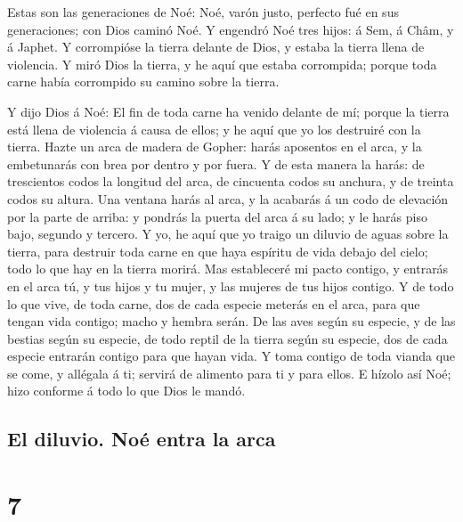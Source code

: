  Estas son las generaciones de Noé: Noé, varón justo,
perfecto fué en sus generaciones; con Dios caminó Noé.  Y
engendró Noé tres hijos: á Sem, á Châm, y á Japhet.  Y
corrompióse la tierra delante de Dios, y estaba la tierra llena de
violencia.  Y miró Dios la tierra, y he aquí que estaba
corrompida; porque toda carne había corrompido su camino sobre la
tierra.

 Y dijo Dios á Noé: El fin de toda carne ha venido
delante de mí; porque la tierra está llena de violencia á causa de
ellos; y he aquí que yo los destruiré con la tierra. 
Hazte un arca de madera de Gopher: harás aposentos en el arca, y la
embetunarás con brea por dentro y por fuera.  Y de esta
manera la harás: de trescientos codos la longitud del arca, de cincuenta
codos su anchura, y de treinta codos su altura.  Una
ventana harás al arca, y la acabarás á un codo de elevación por la parte
de arriba: y pondrás la puerta del arca á su lado; y le harás piso bajo,
segundo y tercero.  Y yo, he aquí que yo traigo un
diluvio de aguas sobre la tierra, para destruir toda carne en que haya
espíritu de vida debajo del cielo; todo lo que hay en la tierra morirá.
 Mas estableceré mi pacto contigo, y entrarás en el arca
tú, y tus hijos y tu mujer, y las mujeres de tus hijos contigo.
 Y de todo lo que vive, de toda carne, dos de cada
especie meterás en el arca, para que tengan vida contigo; macho y hembra
serán.  De las aves según su especie, y de las bestias
según su especie, de todo reptil de la tierra según su especie, dos de
cada especie entrarán contigo para que hayan vida.  Y
toma contigo de toda vianda que se come, y allégala á ti; servirá de
alimento para ti y para ellos.  E hízolo así Noé; hizo
conforme á todo lo que Dios le mandó.

\hypertarget{el-diluvio.-nouxe9-entra-la-arca}{%
\subsection{El diluvio. Noé entra la
arca}\label{el-diluvio.-nouxe9-entra-la-arca}}

\hypertarget{section-01-7}{%
\section{7}\label{section-01-7}}

